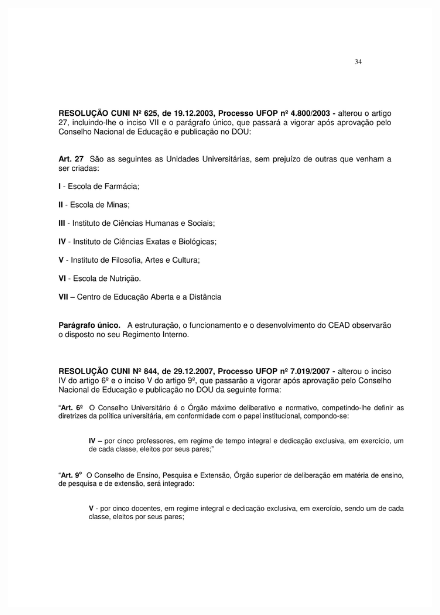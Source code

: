 \begin{figure}[p]
	\centering 
	\includegraphics[scale=0.7]{capitulos/resolucoes/cuni414/cuni414-34.pdf}
\end{figure}